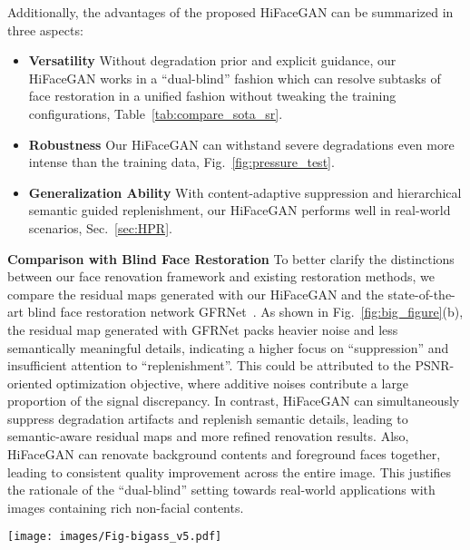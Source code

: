 \documentclass[sigconf]{acmart}
\begin{document}
Additionally, the advantages of the proposed HiFaceGAN can be summarized in three aspects:
\begin{itemize}
  \item \textbf{Versatility} Without degradation prior and explicit guidance, our HiFaceGAN works in a ``dual-blind'' fashion which can resolve subtasks of face restoration in a unified fashion without tweaking the training configurations, Table~\ref{tab:compare_sota_sr}.
  \item \textbf{Robustness} Our HiFaceGAN can withstand severe degradations even more intense than the training data, Fig.~\ref{fig:pressure_test}.
  \item \textbf{Generalization Ability} With content-adaptive suppression and hierarchical semantic guided replenishment, our HiFaceGAN performs well in real-world scenarios, Sec.~\ref{sec:HPR}.
\end{itemize}



\textbf{Comparison with Blind Face Restoration} To better clarify the distinctions between our face renovation framework and existing restoration methods, we compare the residual maps generated with our HiFaceGAN and the state-of-the-art blind face restoration network GFRNet~\cite{BlindFR-ECCV2018}. As shown in Fig.~\ref{fig:big_figure}(b), the residual map generated with GFRNet packs heavier noise and less semantically meaningful details, indicating a higher focus on ``suppression'' and insufficient attention to ``replenishment''. This could be attributed to the PSNR-oriented optimization objective, where additive noises contribute a large proportion of the signal discrepancy. In contrast, HiFaceGAN can simultaneously suppress degradation artifacts and replenish semantic details, leading to semantic-aware residual maps and more refined renovation results. Also, HiFaceGAN can renovate background contents and foreground faces together, leading to consistent quality improvement across the entire image. This justifies the rationale of the ``dual-blind'' setting towards real-world applications with images containing rich non-facial contents.



\begin{figure*}[!tp]
  \centering
  \texttt{[image: images/Fig-bigass\_v5.pdf]}
  \caption{
  Qualitative results of our HiFaceGAN and related state-of-the-art methods on all mentioned sub-tasks. \emph{(Best to view on the computer screen for your convenience to zoom in and compare the quality of visual details.)}
  }\label{fig:big_figure}
\end{figure*}
\end{document}
